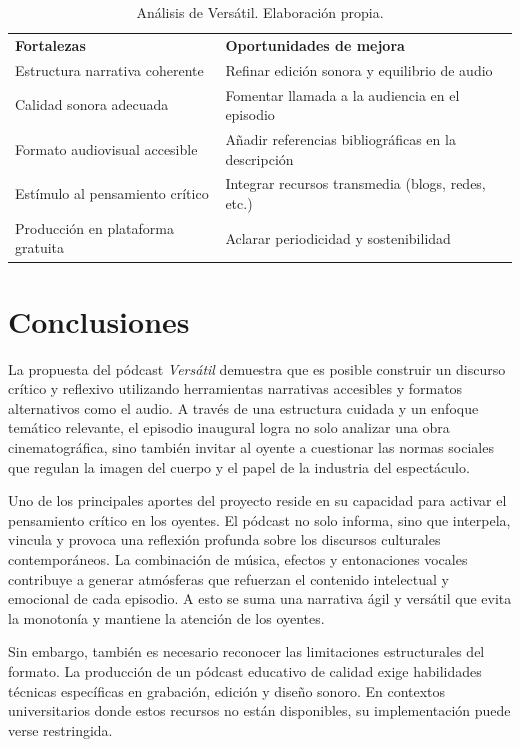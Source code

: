 \documentclass[
]{interact}
\begin{document}
\begin{longtable}[]{@{}
  >{\raggedright\arraybackslash}p{}
  >{\raggedright\arraybackslash}p{}@{}}
\caption{Análisis de Versátil. Elaboración propia.}\tabularnewline
\toprule\noalign{}
\endfirsthead
\endhead
\bottomrule\noalign{}
\endlastfoot
\textbf{Fortalezas} & \textbf{Oportunidades de mejora} \\
Estructura narrativa coherente & Refinar edición sonora y equilibrio de
audio \\
Calidad sonora adecuada & Fomentar llamada a la audiencia en el
episodio \\
Formato audiovisual accesible & Añadir referencias bibliográficas en la
descripción \\
Estímulo al pensamiento crítico & Integrar recursos transmedia (blogs,
redes, etc.) \\
Producción en plataforma gratuita & Aclarar periodicidad y
sostenibilidad \\
\end{longtable}

\section{Conclusiones}\label{conclusiones}

La propuesta del pódcast \emph{Versátil} demuestra que es posible
construir un discurso crítico y reflexivo utilizando herramientas
narrativas accesibles y formatos alternativos como el audio. A través de
una estructura cuidada y un enfoque temático relevante, el episodio
inaugural logra no solo analizar una obra cinematográfica, sino también
invitar al oyente a cuestionar las normas sociales que regulan la imagen
del cuerpo y el papel de la industria del espectáculo.

Uno de los principales aportes del proyecto reside en su capacidad para
activar el pensamiento crítico en los oyentes. El pódcast no solo
informa, sino que interpela, vincula y provoca una reflexión profunda
sobre los discursos culturales contemporáneos. La combinación de música,
efectos y entonaciones vocales contribuye a generar atmósferas que
refuerzan el contenido intelectual y emocional de cada episodio. A esto
se suma una narrativa ágil y versátil que evita la monotonía y mantiene
la atención de los oyentes.

Sin embargo, también es necesario reconocer las limitaciones
estructurales del formato. La producción de un pódcast educativo de
calidad exige habilidades técnicas específicas en grabación, edición y
diseño sonoro. En contextos universitarios donde estos recursos no están
disponibles, su implementación puede verse restringida.
\end{document}
